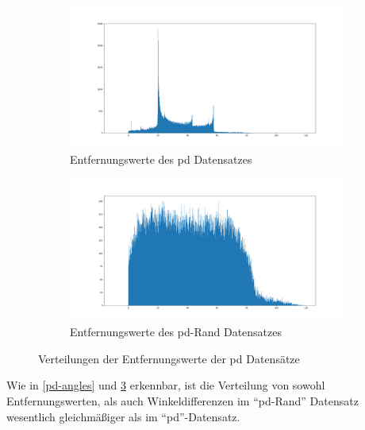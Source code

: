 \begin{figure}[H]
	\centering
	\begin{subfigure}[h]{0.5\textwidth}
		\centering
		\includegraphics[width=\linewidth]{kapitel4/images/plots/pd-distances.png}
		\caption{Entfernungswerte des \acs{pd} Datensatzes}
		\label{pd-drive-distances}
	\end{subfigure}%
	\begin{subfigure}[h]{0.5\textwidth}
		\centering
		\includegraphics[width=\linewidth]{kapitel4/images/plots/pd-rand-distances.png}
		\caption{Entfernungswerte des \acs{pd}-Rand Datensatzes}
		\label{pd-rand-distances}
	\end{subfigure}
	\caption{Verteilungen der Entfernungswerte der \acs{pd} Datensätze}
	\label{pd-distances}
\end{figure}

Wie in \ref{pd-angles} und \ref{pd-distances} erkennbar, ist die Verteilung von sowohl Entfernungswerten, als auch Winkeldifferenzen im  ``\acs{pd}-Rand'' Datensatz wesentlich gleichmäßiger als im ``\acs{pd}''-Datensatz.


